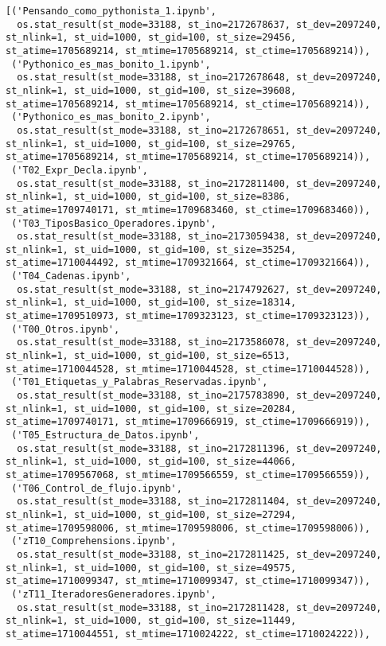 \documentclass[
  letterpaper,
  DIV=11,
  numbers=noendperiod]{scrreprt}
\begin{document}
\begin{verbatim}
[('Pensando_como_pythonista_1.ipynb',
  os.stat_result(st_mode=33188, st_ino=2172678637, st_dev=2097240, st_nlink=1, st_uid=1000, st_gid=100, st_size=29456, st_atime=1705689214, st_mtime=1705689214, st_ctime=1705689214)),
 ('Pythonico_es_mas_bonito_1.ipynb',
  os.stat_result(st_mode=33188, st_ino=2172678648, st_dev=2097240, st_nlink=1, st_uid=1000, st_gid=100, st_size=39608, st_atime=1705689214, st_mtime=1705689214, st_ctime=1705689214)),
 ('Pythonico_es_mas_bonito_2.ipynb',
  os.stat_result(st_mode=33188, st_ino=2172678651, st_dev=2097240, st_nlink=1, st_uid=1000, st_gid=100, st_size=29765, st_atime=1705689214, st_mtime=1705689214, st_ctime=1705689214)),
 ('T02_Expr_Decla.ipynb',
  os.stat_result(st_mode=33188, st_ino=2172811400, st_dev=2097240, st_nlink=1, st_uid=1000, st_gid=100, st_size=8386, st_atime=1709740171, st_mtime=1709683460, st_ctime=1709683460)),
 ('T03_TiposBasico_Operadores.ipynb',
  os.stat_result(st_mode=33188, st_ino=2173059438, st_dev=2097240, st_nlink=1, st_uid=1000, st_gid=100, st_size=35254, st_atime=1710044492, st_mtime=1709321664, st_ctime=1709321664)),
 ('T04_Cadenas.ipynb',
  os.stat_result(st_mode=33188, st_ino=2174792627, st_dev=2097240, st_nlink=1, st_uid=1000, st_gid=100, st_size=18314, st_atime=1709510973, st_mtime=1709323123, st_ctime=1709323123)),
 ('T00_Otros.ipynb',
  os.stat_result(st_mode=33188, st_ino=2173586078, st_dev=2097240, st_nlink=1, st_uid=1000, st_gid=100, st_size=6513, st_atime=1710044528, st_mtime=1710044528, st_ctime=1710044528)),
 ('T01_Etiquetas_y_Palabras_Reservadas.ipynb',
  os.stat_result(st_mode=33188, st_ino=2175783890, st_dev=2097240, st_nlink=1, st_uid=1000, st_gid=100, st_size=20284, st_atime=1709740171, st_mtime=1709666919, st_ctime=1709666919)),
 ('T05_Estructura_de_Datos.ipynb',
  os.stat_result(st_mode=33188, st_ino=2172811396, st_dev=2097240, st_nlink=1, st_uid=1000, st_gid=100, st_size=44066, st_atime=1709567068, st_mtime=1709566559, st_ctime=1709566559)),
 ('T06_Control_de_flujo.ipynb',
  os.stat_result(st_mode=33188, st_ino=2172811404, st_dev=2097240, st_nlink=1, st_uid=1000, st_gid=100, st_size=27294, st_atime=1709598006, st_mtime=1709598006, st_ctime=1709598006)),
 ('zT10_Comprehensions.ipynb',
  os.stat_result(st_mode=33188, st_ino=2172811425, st_dev=2097240, st_nlink=1, st_uid=1000, st_gid=100, st_size=49575, st_atime=1710099347, st_mtime=1710099347, st_ctime=1710099347)),
 ('zT11_IteradoresGeneradores.ipynb',
  os.stat_result(st_mode=33188, st_ino=2172811428, st_dev=2097240, st_nlink=1, st_uid=1000, st_gid=100, st_size=11449, st_atime=1710044551, st_mtime=1710024222, st_ctime=1710024222)),

\end{verbatim}
\end{document}

